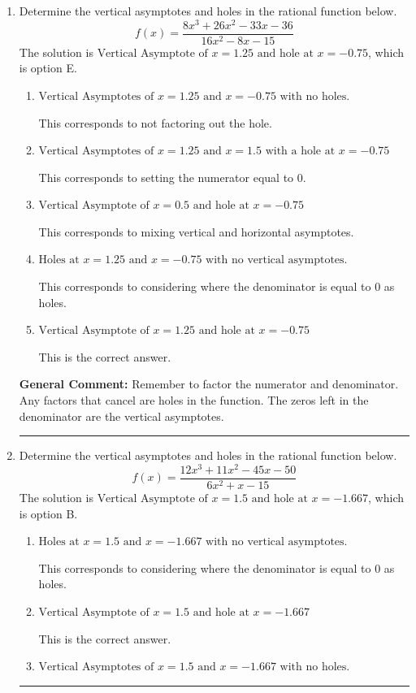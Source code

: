 \documentclass{extbook}[14pt]
\newcommand{\litem}[1]{\item #1

\rule{\textwidth}{0.4pt}}
\begin{document}
\begin{enumerate}\litem{
Determine the vertical asymptotes and holes in the rational function below.
\[ f(x) = \frac{8x^{3} +26 x^{2} -33 x -36}{16x^{2} -8 x -15} \]The solution is \( \text{Vertical Asymptote of } x = 1.25 \text{ and hole at } x = -0.75 \), which is option E.\begin{enumerate}[label=\Alph*.]
\item \( \text{Vertical Asymptotes of } x = 1.25 \text{ and } x = -0.75 \text{ with no holes.} \)

This corresponds to not factoring out the hole.
\item \( \text{Vertical Asymptotes of } x = 1.25 \text{ and } x = 1.5 \text{ with a hole at } x = -0.75 \)

This corresponds to setting the numerator equal to 0.
\item \( \text{Vertical Asymptote of } x = 0.5 \text{ and hole at } x = -0.75 \)

This corresponds to mixing vertical and horizontal asymptotes.
\item \( \text{Holes at } x = 1.25 \text{ and } x = -0.75 \text{ with no vertical asymptotes.} \)

This corresponds to considering where the denominator is equal to 0 as holes.
\item \( \text{Vertical Asymptote of } x = 1.25 \text{ and hole at } x = -0.75 \)

This is the correct answer.
\end{enumerate}

\textbf{General Comment:} Remember to factor the numerator and denominator. Any factors that cancel are holes in the function. The zeros left in the denominator are the vertical asymptotes.
}
\litem{
Determine the vertical asymptotes and holes in the rational function below.
\[ f(x) = \frac{12x^{3} +11 x^{2} -45 x -50}{6x^{2} +x -15} \]The solution is \( \text{Vertical Asymptote of } x = 1.5 \text{ and hole at } x = -1.667 \), which is option B.\begin{enumerate}[label=\Alph*.]
\item \( \text{Holes at } x = 1.5 \text{ and } x = -1.667 \text{ with no vertical asymptotes.} \)

This corresponds to considering where the denominator is equal to 0 as holes.
\item \( \text{Vertical Asymptote of } x = 1.5 \text{ and hole at } x = -1.667 \)

This is the correct answer.
\item \( \text{Vertical Asymptotes of } x = 1.5 \text{ and } x = -1.667 \text{ with no holes.} \)


\end{enumerate}}
\end{enumerate}
\end{document}
